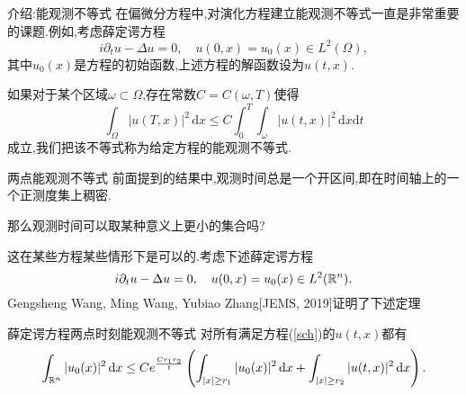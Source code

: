 

\begin{frame}[t]{介绍:能观测不等式}
  在偏微分方程中,对演化方程建立能观测不等式一直是非常重要的课题.例如,考虑薛定谔方程
  \begin{equation}
    i\partial_t u-\Delta u=0,\quad u(0,x)=u_0(x)\in L^2(\Omega),
  \end{equation}
  其中$u_0(x)$是方程的初始函数,上述方程的解函数设为$u(t,x)$.
  
  如果对于某个区域$\omega \subset \Omega$,存在常数$C=C(\omega,T)$使得
  \begin{equation}
    \int_{\Omega}|u(T,x)|^2\,\mathrm{d}x\le C \int_0^T\int_{\omega}|u(t,x)|^2\,\mathrm{d}x\mathrm{d}t\label{obs}
  \end{equation}
  成立,我们把该不等式称为给定方程的能观测不等式.
\end{frame}

\iffalse\begin{frame}[t]
  考虑薛定谔方程 
  \begin{equation}\label{sch}
    i\partial_t u -\Delta u=0,\quad u(0,x)=u_0(x)\in L^2(\R^{n}).
  \end{equation}
 能观测不等式是指下述形式的不等式
 \begin{equation}
   \int_{\Omega}|u(T,x)|^2\,\mathrm{d}x\le C(T,\Omega)\int_{0}^{T}\int_{\omega}|u(t,x)|^2\,\mathrm{d}x\mathrm{d}t,
 \end{equation}
 这里$\omega\subset \Omega$.
 \begin{itemize}
   \item Rosier-Zhang[JDE,2009]证明了全空间情形下有界区域外的可观测性, 即$\omega$ 可取为任意半径的球外.
   \item Jaffard[PM,1990], Komornik-Loreti[2005]证明周期边界条件下任意开集上的可观测性,即$\omega$ 可取为任意开集.
 \end{itemize}
\end{frame}
\fi



\begin{frame}[t]{两点能观测不等式}
  前面提到的结果中,观测时间总是一个开区间,即在时间轴上的一个正测度集上稠密.
  
  那么观测时间可以取某种意义上更小的集合吗?

  这在某些方程某些情形下是可以的.考虑下述薛定谔方程
  \begin{equation}
    i\partial_t u-\Delta u=0,\quad u(0,x)=u_0(x)\in L^2(\mathbb{R}^n).\label{sch}
  \end{equation}
Gengsheng Wang, Ming Wang, Yubiao Zhang[JEMS, 2019]证明了下述定理
  \begin{alertblock}{薛定谔方程两点时刻能观测不等式} 
    对所有满足方程(\ref{sch})的$u(t,x)$都有
  \begin{equation}\label{obsch}
    \int_{\mathbb{R}^{n}}|u_0(x)|^2\,\mathrm{d}x\le Ce^{\frac{Cr_1 r_2}{t}}\left( \int_{|x|\ge r_1}|u_0(x)|^2\,\mathrm{d}x+\int_{|x|\ge r_2}|u(t,x)|^2 \,\mathrm{d}x \right).
  \end{equation}
  \end{alertblock}
\end{frame}

